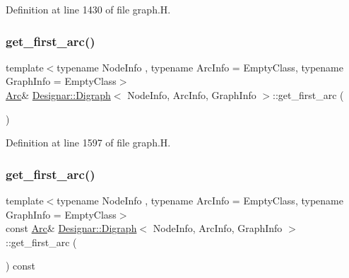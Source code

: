 Definition at line 1430 of file graph.\+H.

\mbox{\label{class_designar_1_1_digraph_af28c0708f3a09f172e4258772f56a476}} 
\subsubsection{\texorpdfstring{get\+\_\+first\+\_\+arc()}{get\_first\_arc()}\hspace{0.1cm}{\footnotesize\ttfamily [1/2]}}
{\footnotesize\ttfamily template$<$typename Node\+Info , typename Arc\+Info  = Empty\+Class, typename Graph\+Info  = Empty\+Class$>$ \\
\hyperlink{class_designar_1_1_digraph_a0ceb278671f2a535c00fddccdeafd69f}{Arc}\& \hyperlink{class_designar_1_1_digraph}{Designar\+::\+Digraph}$<$ Node\+Info, Arc\+Info, Graph\+Info $>$\+::get\+\_\+first\+\_\+arc (\begin{DoxyParamCaption}{ }\end{DoxyParamCaption})\hspace{0.3cm}{\ttfamily [inline]}}



Definition at line 1597 of file graph.\+H.

\mbox{\label{class_designar_1_1_digraph_a7842484a51df899e95a65e979d70079c}} 
\subsubsection{\texorpdfstring{get\+\_\+first\+\_\+arc()}{get\_first\_arc()}\hspace{0.1cm}{\footnotesize\ttfamily [2/2]}}
{\footnotesize\ttfamily template$<$typename Node\+Info , typename Arc\+Info  = Empty\+Class, typename Graph\+Info  = Empty\+Class$>$ \\
const \hyperlink{class_designar_1_1_digraph_a0ceb278671f2a535c00fddccdeafd69f}{Arc}\& \hyperlink{class_designar_1_1_digraph}{Designar\+::\+Digraph}$<$ Node\+Info, Arc\+Info, Graph\+Info $>$\+::get\+\_\+first\+\_\+arc (\begin{DoxyParamCaption}{ }\end{DoxyParamCaption}) const\hspace{0.3cm}{\ttfamily [inline]}}



